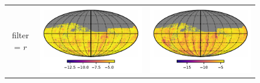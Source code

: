 \documentclass[preprintm,linenumbers]{aastex631}
\begin{document}
\begin{figure}
\begin{tabular}{@{}c@{}c@{}c@{}}
				filter = $r$ & \includegraphics[align=t]{results/skymaps/skymaps_delta_first_year_one_snap_v4_0_10yrs_db_noDD_noTwi_CountMetric_doAllTemplateMetrics_reduceCount_r_7_noDD_noTwi} &			
				\includegraphics[align=t]{results/skymaps/skymaps_delta_first_year_one_snap_v4_0_10yrs_db_noDD_noTwi_CountMetric_doAllTemplateMetrics_reduceCount_r_28_noDD_noTwi} \\
				
				
				
				

\end{tabular}
\end{figure}
\end{document}
